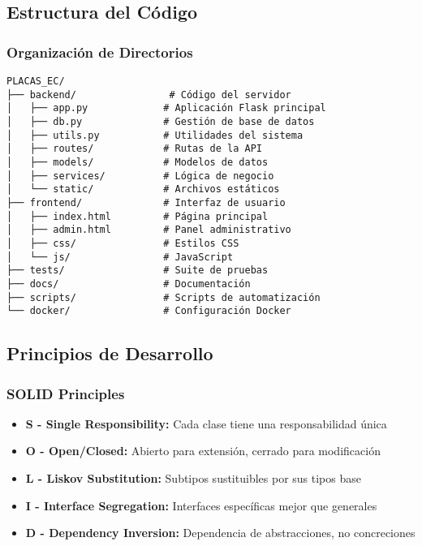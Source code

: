 \documentclass[12pt,a4paper]{article}
\begin{document}
\subsection{Estructura del Código}

\subsubsection{Organización de Directorios}

\begin{lstlisting}
PLACAS_EC/
├── backend/                # Código del servidor
│   ├── app.py             # Aplicación Flask principal
│   ├── db.py              # Gestión de base de datos
│   ├── utils.py           # Utilidades del sistema
│   ├── routes/            # Rutas de la API
│   ├── models/            # Modelos de datos
│   ├── services/          # Lógica de negocio
│   └── static/            # Archivos estáticos
├── frontend/              # Interfaz de usuario
│   ├── index.html         # Página principal
│   ├── admin.html         # Panel administrativo
│   ├── css/               # Estilos CSS
│   └── js/                # JavaScript
├── tests/                 # Suite de pruebas
├── docs/                  # Documentación
├── scripts/               # Scripts de automatización
└── docker/                # Configuración Docker
\end{lstlisting}

\subsection{Principios de Desarrollo}

\subsubsection{SOLID Principles}

\begin{itemize}
    \item \textbf{S - Single Responsibility:} Cada clase tiene una responsabilidad única
    \item \textbf{O - Open/Closed:} Abierto para extensión, cerrado para modificación
    \item \textbf{L - Liskov Substitution:} Subtipos sustituibles por sus tipos base
    \item \textbf{I - Interface Segregation:} Interfaces específicas mejor que generales
    \item \textbf{D - Dependency Inversion:} Dependencia de abstracciones, no concreciones
\end{itemize}
\end{document}
